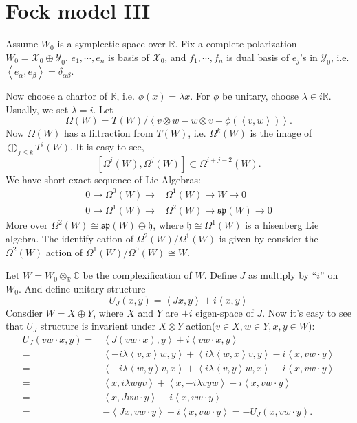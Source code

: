 \documentclass[12pt]{article}
\def\bR{{\mathbb{R}}}
\def\bC{{\mathbb{C}}}
\def\sp{{\mathfrak{sp}}}
\def\inn#1#2{\left\langle{#1},{#2}\right\rangle}
\def\fhh{\mathfrak{h}}
\def\cxx{\mathcal{X}}
\def\cyy{\mathcal{Y}}
\begin{document}
\section{Fock model III}
Assume $W_0$ is a symplectic space over $\bR$.
Fix a complete polarization $W_0 = \cxx_0\oplus \cyy_0$.  
$e_1,\cdots, e_n$ is basis of $\cxx_0$, and $f_1,\cdots, f_n$ is dual basis 
of $e_j$'s in $\cyy_0$, i.e. $\inn{e_\alpha}{e_\beta}=\delta_{\alpha\beta}$.

Now choose a chartor of $\bR$, i.e. $\phi(x) = \lambda x$. 
For $\phi$ be unitary, choose $\lambda \in i\bR$. Usually, we set $\lambda=i$. 
Let
\[
\Omega(W) = T(W) / \left\langle v\otimes w - w\otimes v - \phi(\inn{v}{w})\right\rangle.
\]
Now $\Omega(W)$ has a filtraction from $T(W)$, i.e. 
$\Omega^k(W)$ is the image of $\bigoplus_{j\leq k}T^j(W)$.
It is easy to see, 
\[
[\Omega^i(W),\Omega^j(W)] \subset \Omega^{i+j-2}(W).
\]
We have short exact sequence of Lie Algebras:
\begin{align}
0\to \Omega^0(W) \to &\Omega^1(W) \to W \to 0\\
0\to \Omega^1(W) \to &\Omega^2(W) \to \sp(W)\to 0 
\end{align}
More over $\Omega^2(W) \cong \sp(W) \oplus \fhh$, 
where $\fhh\cong \Omega^1(W)$ is a hisenberg Lie algebra.
The identify cation of $\Omega^2(W)/\Omega^1(W)$ is given by
consider the $\Omega^2(W)$ action of $\Omega^1(W)/\Omega^0(W)\cong W$. 

Let $W=W_0\otimes_\bR\bC$ be the complexification of $W$. 
Define $J$ as multiply by ``$i$'' on $W_0$. And define unitary structure
\[
U_J(x,y) = \inn{Jx}{y} + i\inn{x}{y}
\]
Consdier $W = X\oplus Y$, where $X$ and $Y$ are $\pm i$ eigen-space of $J$. 
Now it's easy to see that $U_J$ structure is 
invarient under $X\otimes Y$ action($v\in X, w\in Y, x,y\in W$):
\[
\begin{split}
U_J(vw\cdot x,y) =& \inn{J(vw\cdot x)}{y} + i\inn{vw\cdot x}{y}\\
=&\inn{-i\lambda\inn{v}{x} w}{y}
+\inn{i\lambda\inn{w}{x} v}{y}
 - i \inn{x}{vw\cdot y}\\
=& \inn{-i\lambda\inn{w}{y}v}{x}
+ \inn{i\lambda \inn{v}{y}w}{x}
-i\inn{x}{vw\cdot y}\\
=& \inn{x}{i\lambda{w}{y}v}
+ \inn{x}{-i\lambda{v}{y}w}
-i\inn{x}{vw\cdot y}\\
=& \inn{x}{J vw\cdot y} -i\inn{x}{vw\cdot y}\\
=& -\inn{Jx}{vw\cdot y}  -i\inn{x}{vw\cdot y}= -U_J(x,vw\cdot y).
\end{split}
\]
\end{document}
